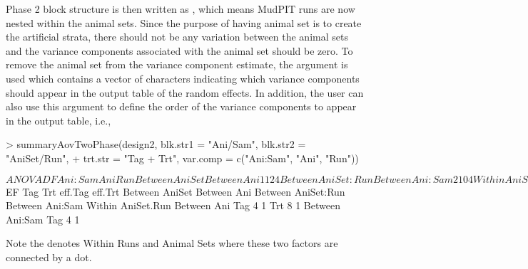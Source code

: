 \documentclass[article]{jss}
\begin{document}
Phase 2 block structure is then written as , which means MudPIT runs are now nested within the animal sets. Since the purpose of having animal set is to create the artificial strata, there should not be any variation between the animal sets and the variance components associated with the animal set should be zero. To remove the animal set from the variance component estimate, the  argument is used which contains a vector of characters indicating which variance components should appear in the output table of the random effects. In addition, the user can also use this argument to define the order of the variance components to appear in the output table, i.e.,
\begin{CodeChunk}
\begin{CodeInput}
> summaryAovTwoPhase(design2, blk.str1 = "Ani/Sam", blk.str2 = "AniSet/Run", 
+	trt.str = "Tag + Trt", var.comp = c("Ani:Sam", "Ani", "Run"))                                    
\end{CodeInput}
\begin{CodeOutput}
$ANOVA
                   DF Ani:Sam Ani Run
Between AniSet                       
   Between Ani     1  1       2   4  
Between AniSet:Run                   
   Between Ani:Sam 2  1       0   4  
Within AniSet.Run                    
   Between Ani                       
      Tag          1  1       2   0  
      Trt          1  1       2   0  
      Residual     4  1       2   0  
   Between Ani:Sam                   
      Tag          2  1       0   0  
      Residual     4  1       0   0  

$EF
                   Tag Trt eff.Tag eff.Trt
Between AniSet                            
   Between Ani                            
Between AniSet:Run                        
   Between Ani:Sam                        
Within AniSet.Run                         
   Between Ani                            
      Tag          4       1              
      Trt              8           1      
   Between Ani:Sam                        
      Tag          4       1              
\end{CodeOutput}
\end{CodeChunk}
Note the  denotes Within Runs and Animal Sets where these two factors are connected by a dot.  
\end{document}
